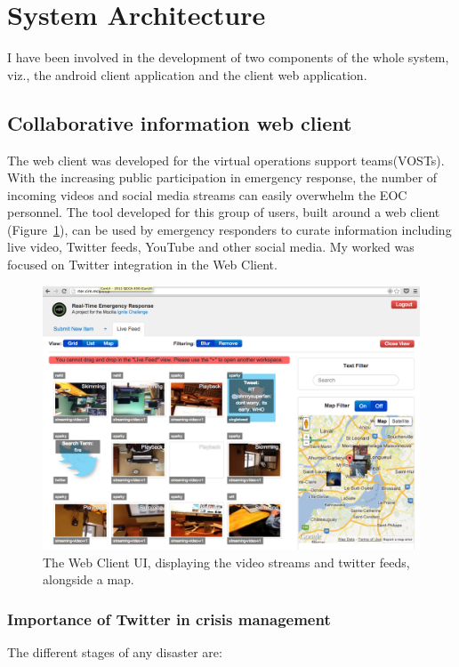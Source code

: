 \section{System Architecture}
I have been involved in the development of two components of the whole system, viz., the android client application and the client web application.



\subsection{Collaborative information web client}
The web client was developed for the virtual operations support teams(VOSTs). With the increasing public participation in emergency response, the number of incoming videos and social media streams can easily overwhelm the EOC personnel. The tool developed for this group of users, built around a web client (Figure~\ref{fig:clientscreen}), can be used by emergency responders to curate information including live video, Twitter feeds, YouTube and other social media.  My worked was focused on Twitter integration in the Web Client.
\begin{figure}
\begin{center}
\includegraphics[scale=0.3]{clientscreen.png}
\caption{The Web Client UI, displaying the video streams and twitter feeds, alongside a map.}
\label{fig:clientscreen}
\end{center}
\end{figure}
\subsubsection{Importance of Twitter in crisis management}
The different stages of any disaster are: 


